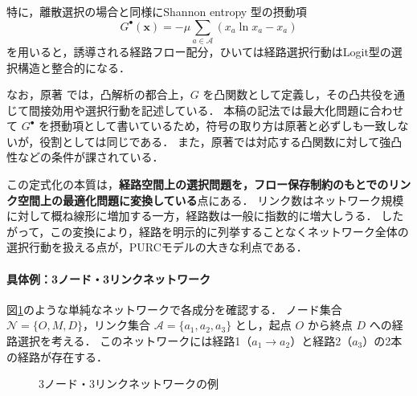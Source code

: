 特に，離散選択の場合と同様にShannon entropy 型の摂動項
\begin{equation}\label{eq:purc_entropy}
  G^\bullet(\bm{x}) = -\mu \sum_{a \in \mathcal{A}} \left( x_a \ln x_a - x_a \right)
\end{equation}
を用いると，誘導される経路フロー配分，ひいては経路選択行動はLogit型の選択構造と整合的になる．

なお，原著 \cite{fosgerau2022perturbed} では，凸解析の都合上，$G$ を凸関数として定義し，その凸共役を通じて間接効用や選択行動を記述している．
本稿の記法では最大化問題に合わせて $G^\bullet$ を摂動項として書いているため，符号の取り方は原著と必ずしも一致しないが，役割としては同じである．
また，原著では対応する凸関数に対して強凸性などの条件が課されている．

この定式化の本質は，\textbf{経路空間上の選択問題を，フロー保存制約のもとでのリンク空間上の最適化問題に変換している}点にある．
リンク数はネットワーク規模に対して概ね線形に増加する一方，経路数は一般に指数的に増大しうる．
したがって，この変換により，経路を明示的に列挙することなくネットワーク全体の選択行動を扱える点が，PURCモデルの大きな利点である．


\paragraph{具体例：3ノード・3リンクネットワーク}
図\ref{fig:purc_network}のような単純なネットワークで各成分を確認する．
ノード集合 $\mathcal{N} = \{O, M, D\}$，リンク集合 $\mathcal{A} = \{a_1, a_2, a_3\}$ とし，起点 $O$ から終点 $D$ への経路選択を考える．
このネットワークには経路1（$a_1 \to a_2$）と経路2（$a_3$）の2本の経路が存在する．
\begin{figure}[t]
  \centering
  \resizebox{.55\linewidth}{!}{}
  \caption{3ノード・3リンクネットワークの例}
  \label{fig:purc_network}
\end{figure}

